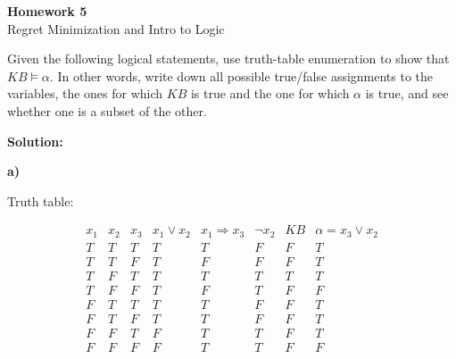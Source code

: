 \documentclass[10pt,a4paper]{exam}
\newcommand{\KB}{\mathit{KB}}
\begin{document}
\begin{center}
    {\Large \textbf{Homework 5}}\\[0.5em]
    {\large Regret Minimization and Intro to Logic}
\end{center}

\begin{questions}

\question[30]
Given the following logical statements, use truth-table enumeration to show that $\KB \models \alpha$. In other words, write down all possible true/false assignments to the variables, the ones for which $\KB$ is true and the one for which $\alpha$ is true, and see whether one is a subset of the other.

\textbf{Solution:}

\textbf{a)}

Truth table:

\[
\begin{array}{c|c|c|c|c|c|c|c}
x_1 & x_2 & x_3 & x_1\lor x_2 & x_1\Rightarrow x_3 & \neg x_2 & KB & \alpha=x_3\lor x_2 \\
\hline
T & T & T & T & T & F & F & T \\
T & T & F & T & F & F & F & T \\
T & F & T & T & T & T & T & T \\
T & F & F & T & F & T & F & F \\
F & T & T & T & T & F & F & T \\
F & T & F & T & T & F & F & T \\
F & F & T & F & T & T & F & T \\
F & F & F & F & T & T & F & F
\end{array}
\]


\end{questions}
\end{document}

